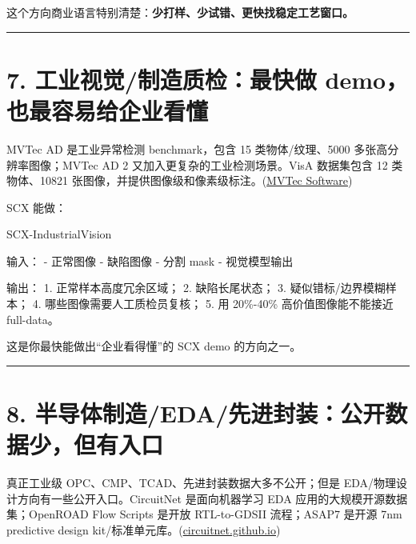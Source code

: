 \documentclass[
  12pt,
]{ctexart}
\newenvironment{Shaded}{}{}
\newcommand{\NormalTok}[1]{#1}
\begin{document}
这个方向商业语言特别清楚：\textbf{少打样、少试错、更快找稳定工艺窗口。}

\begin{center}\rule{0.5\linewidth}{0.5pt}\end{center}

\section{7. 工业视觉/制造质检：最快做
demo，也最容易给企业看懂}\label{ux5de5ux4e1aux89c6ux89c9ux5236ux9020ux8d28ux68c0ux6700ux5febux505a-demoux4e5fux6700ux5bb9ux6613ux7ed9ux4f01ux4e1aux770bux61c2}

MVTec AD 是工业异常检测 benchmark，包含 15 类物体/纹理、5000
多张高分辨率图像；MVTec AD 2 又加入更复杂的工业检测场景。VisA 数据集包含
12 类物体、10821
张图像，并提供图像级和像素级标注。(\href{https://www.mvtec.com/research-teaching/datasets/mvtec-ad?utm_source=chatgpt.com}{MVTec
Software})

SCX 能做：

\begin{Shaded}
\begin{Highlighting}[]
\NormalTok{SCX{-}IndustrialVision}

\NormalTok{输入：}
\NormalTok{{-} 正常图像}
\NormalTok{{-} 缺陷图像}
\NormalTok{{-} 分割 mask}
\NormalTok{{-} 视觉模型输出}

\NormalTok{输出：}
\NormalTok{1. 正常样本高度冗余区域；}
\NormalTok{2. 缺陷长尾状态；}
\NormalTok{3. 疑似错标/边界模糊样本；}
\NormalTok{4. 哪些图像需要人工质检员复核；}
\NormalTok{5. 用 20\%{-}40\% 高价值图像能不能接近 full{-}data。}
\end{Highlighting}
\end{Shaded}

这是你最快能做出``企业看得懂''的 SCX demo 的方向之一。

\begin{center}\rule{0.5\linewidth}{0.5pt}\end{center}

\section{8.
半导体制造/EDA/先进封装：公开数据少，但有入口}\label{ux534aux5bfcux4f53ux5236ux9020edaux5148ux8fdbux5c01ux88c5ux516cux5f00ux6570ux636eux5c11ux4f46ux6709ux5165ux53e3}

真正工业级 OPC、CMP、TCAD、先进封装数据大多不公开；但是
EDA/物理设计方向有一些公开入口。CircuitNet 是面向机器学习 EDA
应用的大规模开源数据集；OpenROAD Flow Scripts 是开放 RTL-to-GDSII
流程；ASAP7 是开源 7nm predictive design
kit/标准单元库。(\href{https://circuitnet.github.io/?utm_source=chatgpt.com}{circuitnet.github.io})
\end{document}
